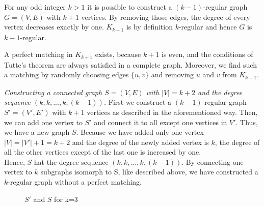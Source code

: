 \documentclass[a4paper]{article}
\begin{document}
\begin{solution}{11}
\begin{lemma}{For any odd integer $k > 1$ it is possible to construct a $(k-1)$-regular graph $G=(V,E)$ with $k+1$ vertices.}
			By removing those edges, the degree of every vertex decreases exactly by one. 
			$K_{k+1}$ is by definition $k$-regular and hence $G$ is $k-1$-regular.

			A perfect matching in $K_{k+1}$ exists, because $k+1$ is even, and the conditions of Tutte's theorem are always satisfied in a complete graph. Moreover, we find such a matching by randomly choosing edges $\{u,v\}$ and removing $u$ and $v$ from $K_{k+1}$. 
		\end{lemma}
		
		\emph{Constructing a connected graph $S=(V,E)$ with $|V|=k+2$ and the degree sequence $( k,k,...,k,(k-1))$. }  
		First we construct a $(k-1)$-regular graph $S' = (V',E')$ with $k+1$ vertices as described in the aforementioned way. Then, we can add one vertex to $S'$ and connect it to all except one vertices in $V'$. Thus, we have a new graph $S$. 
		Because we have added only one vertex $|V| = |V'| +1 = k+2$ and the degree of the newly added vertex is $k$, the degree of all the other vertices except of the last one is increased by one.\\

		Hence, $S$ hat the degree sequence $(k,k,...,k,(k-1))$. 
		By connecting one vertex to $k$ subgraphs isomorph to S, like described above, we have constructed a $k$-regular graph without a perfect matching.
		\begin{figure}[h]
			\centering
		\caption{$S'$ and $S$ for k=3}
		\end{figure}
	\end{solution}
\end{document}
